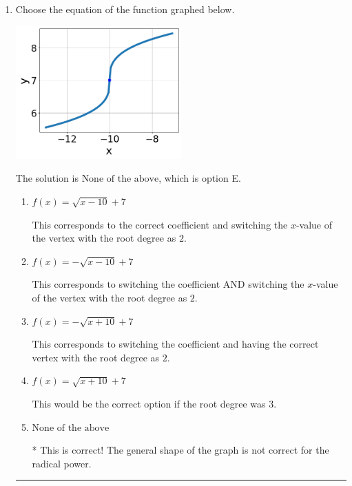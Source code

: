 \documentclass{extbook}[14pt]
\newcommand{\litem}[1]{\item #1

\rule{\textwidth}{0.4pt}}
\begin{document}
\begin{enumerate}\litem{
Choose the equation of the function graphed below.

\begin{center}
    \includegraphics[width=0.5\textwidth]{../Figures/radicalGraphToEquationA.png}
\end{center}


The solution is \( \text{None of the above} \), which is option E.\begin{enumerate}[label=\Alph*.]
\item \( f(x) = \sqrt{x - 10} + 7 \)

This corresponds to the correct coefficient and switching the $x$-value of the vertex with the root degree as $2$.
\item \( f(x) = - \sqrt{x - 10} + 7 \)

This corresponds to switching the coefficient AND switching the $x$-value of the vertex with the root degree as $2$.
\item \( f(x) = - \sqrt{x + 10} + 7 \)

This corresponds to switching the coefficient and having the correct vertex with the root degree as $2$.
\item \( f(x) = \sqrt{x + 10} + 7 \)

This would be the correct option if the root degree was $3$.
\item \( \text{None of the above} \)

* This is correct! The general shape of the graph is not correct for the radical power.
\end{enumerate}

}
\end{enumerate}
\end{document}
